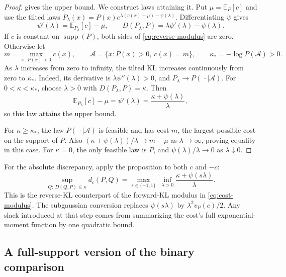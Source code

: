 \documentclass[11pt,twoside]{article}
\newcommand{\E}{\mathbb E}
\newcommand{\KL}{D}
\theoremstyle{definition}
\theoremstyle{remark}
\begin{document}
\begin{proof}
 gives the upper bound. We construct laws attaining
it. Put \(\mu=\E_P[c]\) and use the tilted laws
\(P_\lambda(x)=P(x)e^{\lambda(c(x)-\mu)-\psi(\lambda)}\).
Differentiating \(\psi\) gives
\[
 \psi'(\lambda)=\E_{P_\lambda}[c]-\mu,\qquad
 \KL(P_\lambda, P)=\lambda\psi'(\lambda)-\psi(\lambda).
\]
If \(c\) is constant on \(\operatorname{supp}(P)\), both sides of
\cref{eq:reverse-modulus} are zero. Otherwise let
\[
 m=\max_{x:\,P(x)>0}c(x),\qquad
 \mathcal A=\{x:P(x)>0,\ c(x)=m\},\qquad
 \kappa_*=-\log P(\mathcal A)>0.
\]
As \(\lambda\) increases from zero to infinity, the tilted KL
increases continuously from zero to \(\kappa_*\). Indeed, its derivative
is \(\lambda\psi''(\lambda)>0\), and
\(P_\lambda\to P(\,\cdot\mid\mathcal A)\).
For \(0<\kappa<\kappa_*\), choose \(\lambda>0\) with
\(\KL(P_\lambda, P)=\kappa\). Then
\[
 \E_{P_\lambda}[c]-\mu
 =\psi'(\lambda)=\frac{\kappa+\psi(\lambda)}{\lambda},
\]
so this law attains the upper bound.

For \(\kappa\ge\kappa_*\), the law \(P(\,\cdot\mid\mathcal A)\) is feasible
and has cost \(m\), the largest possible cost on the support of \(P\).
Also \((\kappa+\psi(\lambda))/\lambda\to m-\mu\) as
\(\lambda\to\infty\), proving equality in this case.
For \(\kappa=0\), the only feasible law is \(P\), and
\(\psi(\lambda)/\lambda\to0\) as \(\lambda\downarrow0\).
\end{proof}

For the absolute discrepancy, apply the proposition to both \(c\)
and \(-c\):
\[
 \sup_{Q:\,\KL(Q, P)\le\kappa}d_c(P,Q)
 =\max_{s\in\{-1,1\}}\;
   \inf_{\lambda>0}\frac{\kappa+\psi(s\lambda)}{\lambda}.
\]
This is the reverse-KL counterpart of the forward-KL modulus in
\cref{eq:cost-modulus}. The subgaussian conversion replaces
\(\psi(s\lambda)\) by \(\lambda^2v_P(c)/2\). Any slack introduced
at that step comes from summarizing the cost's full exponential-moment
function by one quadratic bound.

\subsection{A full-support version of the binary comparison}
\end{document}
